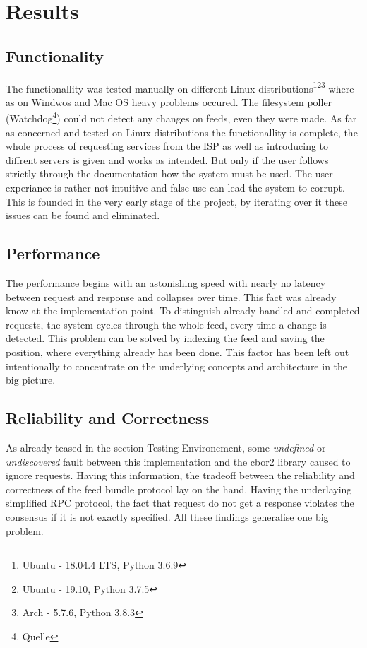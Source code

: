 \section{Results}
\subsection{Functionality}
The functionallity was tested manually on different Linux distributions\footnote{Ubuntu - 18.04.4 LTS, Python 3.6.9}\footnote{Ubuntu - 19.10, Python 3.7.5}\footnote{Arch - 5.7.6, Python 3.8.3} where as on Windwos and Mac OS heavy problems occured. The filesystem poller (Watchdog\footnote{Quelle}) could not detect any changes on feeds, even they were made. As far as concerned and tested on Linux distributions the functionallity is complete, the whole process of requesting services from the ISP as well as introducing to diffrent servers is given and works as intended. But only if the user follows strictly through the documentation how the system must be used. The user experiance is rather not intuitive and false use can lead the system to corrupt. This is founded in the very early stage of the project, by iterating over it these issues can be found and eliminated.
\subsection{Performance}
The performance begins with an astonishing speed with nearly no latency between request and response and collapses over time. This fact was already know at the implementation point. To distinguish already handled and completed requests, the system cycles through the whole feed, every time a change is detected. This problem can be solved by indexing the feed and saving the position, where everything already has been done. This factor has been left out intentionally to concentrate on the underlying concepts and architecture in the big picture.
\subsection{Reliability and Correctness}
As already teased in the section Testing Environement, some \textit{undefined} or \textit{undiscovered} fault between this implementation and the cbor2 library caused to ignore requests. Having this information, the tradeoff between the reliability and correctness of the feed bundle protocol lay on the hand. Having the underlaying simplified RPC protocol, the fact that request do not get a response violates the consensus if it is not exactly specified. All these findings generalise one big problem. 

